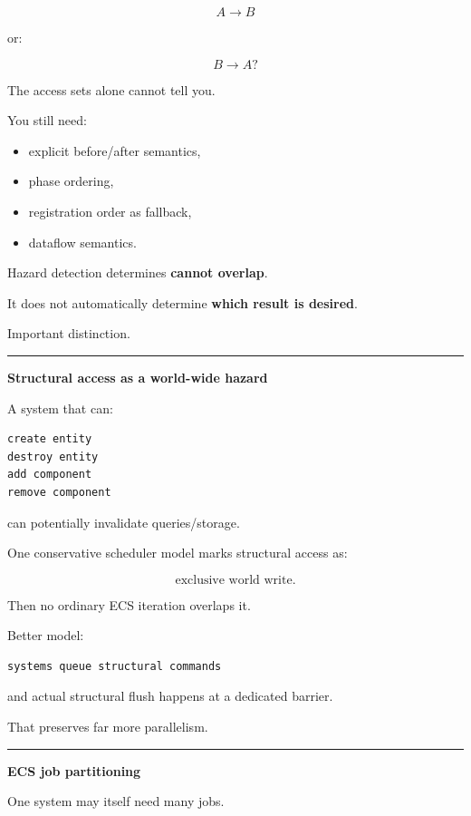 \[
A\rightarrow B
\]

or:

\[
B\rightarrow A?
\]

The access sets alone cannot tell you.

You still need:

\begin{itemize}
\tightlist
\item
  explicit before/after semantics,
\item
  phase ordering,
\item
  registration order as fallback,
\item
  dataflow semantics.
\end{itemize}

Hazard detection determines \textbf{cannot overlap}.

It does not automatically determine \textbf{which result is desired}.

Important distinction.

\begin{center}\rule{0.5\linewidth}{0.5pt}\end{center}

\textbf{Structural access as a world-wide hazard}

A system that can:

\begin{verbatim}
create entity
destroy entity
add component
remove component
\end{verbatim}

can potentially invalidate queries/storage.

One conservative scheduler model marks structural access as:

\[
\text{exclusive world write}.
\]

Then no ordinary ECS iteration overlaps it.

Better model:

\begin{verbatim}
systems queue structural commands
\end{verbatim}

and actual structural flush happens at a dedicated barrier.

That preserves far more parallelism.

\begin{center}\rule{0.5\linewidth}{0.5pt}\end{center}

\textbf{ECS job partitioning}

One system may itself need many jobs.

